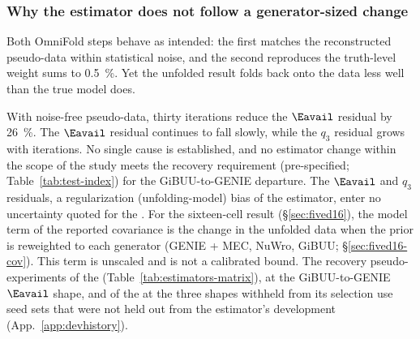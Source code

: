 \subsubsection{Why the estimator does not follow a generator-sized change}
\label{sec:val-departure}

Both OmniFold steps behave as intended: the first matches the reconstructed pseudo-data within statistical noise, and the second reproduces the truth-level weight sums to \SI{0.5}{\percent}. Yet the unfolded result folds back onto the data less well than the true model does.

With noise-free pseudo-data, thirty iterations reduce the $\Eavail$ residual by \SI{26}{\percent}. The $\Eavail$ residual continues to fall slowly, while the $q_3$ residual grows with iterations. No single cause is established, and no estimator change within the scope of the study meets the recovery requirement (pre-specified; Table~\ref{tab:test-index}) for the GiBUU-to-GENIE departure. The $\Eavail$ and $q_3$ residuals, a regularization (unfolding-model) bias of the estimator, enter no uncertainty quoted for the \resFiveAxis{}. For the sixteen-cell result (\S\ref{sec:fived16}), the model term of the reported covariance is the change in the unfolded data when the prior is reweighted to each generator (GENIE + MEC, NuWro, GiBUU; \S\ref{sec:fived16-cov}). This term is unscaled and is not a calibrated bound. The recovery pseudo-experiments of the \estLowCap{} (Table~\ref{tab:estimators-matrix}), at the GiBUU-to-GENIE $\Eavail$ shape, and of the \estMultiD{} at the three shapes withheld from its selection use seed sets that were not held out from the estimator's development (App.~\ref{app:devhistory}).

